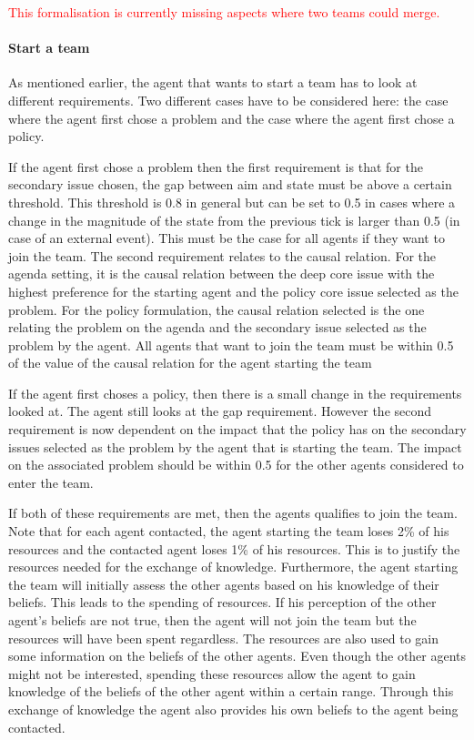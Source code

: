 \textcolor{red}{This formalisation is currently missing aspects where two teams could merge.}

\paragraph{Start a team}

As mentioned earlier, the agent that wants to start a team has to look at different requirements. Two different cases have to be considered here: the case where the agent first chose a problem and the case where the agent first chose a policy.

If the agent first chose a problem then the first requirement is that for the secondary issue chosen, the gap between aim and state must be above a certain threshold. This threshold is 0.8 in general but can be set to 0.5 in cases where a change in the magnitude of the state from the previous tick is larger than 0.5 (in case of an external event). This must be the case for all agents if they want to join the team. The second requirement relates to the causal relation. For the agenda setting, it is the causal relation between the deep core issue with the highest preference for the starting agent and the policy core issue selected as the problem. For the policy formulation, the causal relation selected is the one relating the problem on the agenda and the secondary issue selected as the problem by the agent. All agents that want to join the team must be within 0.5 of the value of the causal relation for the agent starting the team

If the agent first choses a policy, then there is a small change in the requirements looked at. The agent still looks at the gap requirement. However the second requirement is now dependent on the impact that the policy has on the secondary issues selected as the problem by the agent that is starting the team. The impact on the associated problem should be within 0.5 for the other agents considered to enter the team.

If both of these requirements are met, then the agents qualifies to join the team. Note that for each agent contacted, the agent starting the team loses 2\% of his resources and the contacted agent loses 1\% of his resources. This is to justify the resources needed for the exchange of knowledge. Furthermore, the agent starting the team will initially assess the other agents based on his knowledge of their beliefs. This leads to the spending of resources. If his perception of the other agent's beliefs are not true, then the agent will not join the team but the resources will have been spent regardless. The resources are also used to gain some information on the beliefs of the other agents. Even though the other agents might not be interested, spending these resources allow the agent to gain knowledge of the beliefs of the other agent within a certain range. Through this exchange of knowledge the agent also provides his own beliefs to the agent being contacted.

